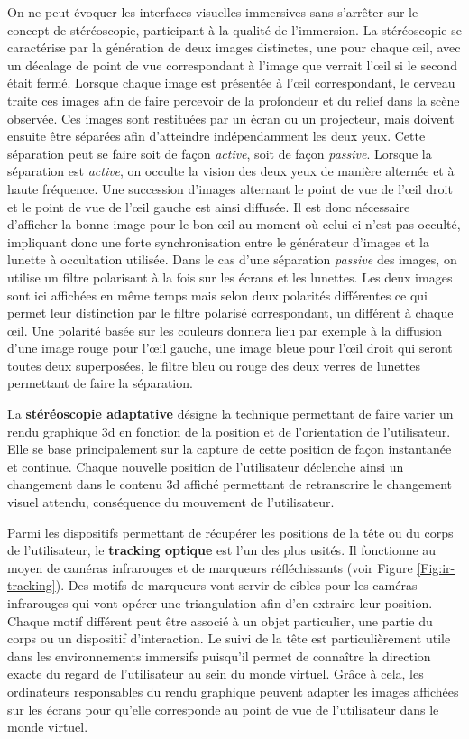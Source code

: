 On ne peut évoquer les interfaces visuelles immersives sans s'arrêter sur le concept de stéréoscopie, participant à la qualité de l'immersion. La stéréoscopie se caractérise par la génération de deux images distinctes, une pour chaque œil, avec un décalage de point de vue correspondant à l'image que verrait l'œil si le second était fermé. Lorsque chaque image est présentée à l'œil correspondant, le cerveau traite ces images afin de faire percevoir de la profondeur et du relief dans la scène observée. Ces images sont restituées par un écran ou un projecteur, mais doivent ensuite être séparées afin d'atteindre indépendamment les deux yeux. Cette séparation peut se faire soit de façon \textit{active}, soit de façon \textit{passive}. Lorsque la séparation est \textit{active}, on occulte la vision des deux yeux de manière alternée et à haute fréquence. Une succession d'images alternant le point de vue de l'œil droit et le point de vue de l'œil gauche est ainsi diffusée. Il est donc nécessaire d'afficher la bonne image pour le bon œil au moment où celui-ci n'est pas occulté, impliquant donc une forte synchronisation entre le générateur d'images et la lunette à occultation utilisée.
Dans le cas d'une séparation \textit{passive} des images, on utilise un filtre polarisant à la fois sur les écrans et les lunettes. Les deux images sont ici affichées en même temps mais selon deux polarités différentes ce qui permet leur distinction par le filtre polarisé correspondant, un différent à chaque œil. Une polarité basée sur les couleurs donnera lieu par exemple à la diffusion d'une image rouge pour l'œil gauche, une image bleue pour l'œil droit qui seront toutes deux superposées, le filtre bleu ou rouge des deux verres de lunettes permettant de faire la séparation.

 \label{visu_adaptative}

La \textbf{stéréoscopie adaptative} désigne la technique permettant de faire varier un rendu graphique 3d en fonction de la position et de l'orientation de l'utilisateur. Elle se base principalement sur la capture de cette position de façon instantanée et continue. Chaque nouvelle position de l'utilisateur déclenche ainsi un changement dans le contenu 3d affiché permettant de retranscrire le changement visuel attendu, conséquence du mouvement de l'utilisateur.

Parmi les dispositifs permettant de récupérer les positions de la tête ou du corps de l'utilisateur, le \textbf{tracking optique} est l'un des plus usités. Il fonctionne au moyen de caméras infrarouges et de marqueurs réfléchissants (voir Figure \ref{Fig:ir-tracking}). Des motifs de marqueurs vont servir de cibles pour les caméras infrarouges qui vont opérer une triangulation afin d'en extraire leur position. Chaque motif différent peut être associé à un objet particulier, une partie du corps ou un dispositif d'interaction. Le suivi de la tête est particulièrement utile dans les environnements immersifs puisqu'il permet de connaître la direction exacte du regard de l'utilisateur au sein du monde virtuel. Grâce à cela, les ordinateurs responsables du rendu graphique peuvent adapter les images affichées sur les écrans pour qu'elle corresponde au point de vue de l'utilisateur dans le monde virtuel.

